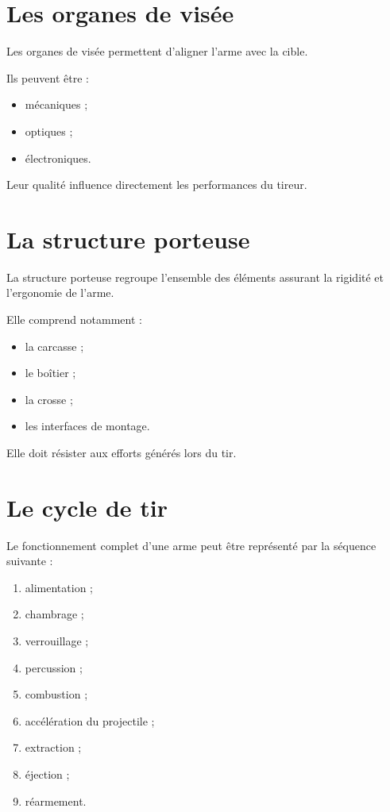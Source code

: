 \section{Les organes de visée}

Les organes de visée permettent d'aligner l'arme avec la cible.

Ils peuvent être :

\begin{itemize}
    \item mécaniques ;
    \item optiques ;
    \item électroniques.
\end{itemize}

Leur qualité influence directement les performances du tireur.

\section{La structure porteuse}

La structure porteuse regroupe l'ensemble des éléments assurant la rigidité
et l'ergonomie de l'arme.

Elle comprend notamment :

\begin{itemize}
    \item la carcasse ;
    \item le boîtier ;
    \item la crosse ;
    \item les interfaces de montage.
\end{itemize}

Elle doit résister aux efforts générés lors du tir.

\section{Le cycle de tir}

Le fonctionnement complet d'une arme peut être représenté par la séquence
suivante :

\begin{enumerate}
    \item alimentation ;
    \item chambrage ;
    \item verrouillage ;
    \item percussion ;
    \item combustion ;
    \item accélération du projectile ;
    \item extraction ;
    \item éjection ;
    \item réarmement.
\end{enumerate}

